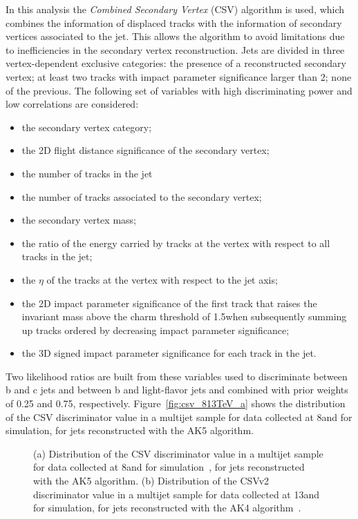 In this analysis the {\itshape Combined Secondary Vertex} (CSV) algorithm is used, which combines the information of displaced tracks with the information of secondary vertices associated to the jet.
This allows the algorithm to avoid limitations due to inefficiencies in the secondary vertex reconstruction. Jets are divided in three vertex-dependent exclusive categories: the presence of a reconstructed secondary vertex; at least two tracks with impact parameter significance larger than 2; none of the previous. The following set of variables with high discriminating power and low correlations are considered:

\begin{itemize}
\item the secondary vertex category;
\item the 2D flight distance significance of the secondary vertex;
\item the number of tracks in the jet
\item the number of tracks associated to the secondary vertex;
\item the secondary vertex mass;
\item the ratio of the energy carried by tracks at the vertex with respect to all tracks in the jet;
\item the $\eta$ of the tracks at the vertex with respect to the jet axis;
\item the 2D impact parameter significance of the first track that raises the invariant mass above the charm threshold of 1.5\GeV when subsequently summing up tracks ordered by decreasing impact parameter significance;
\item the 3D signed impact parameter significance for each track in the jet.
\end{itemize}

Two likelihood ratios are built from these variables used to discriminate between b and c jets and between b and light-flavor jets and combined with prior weights of 0.25 and 0.75, respectively. Figure~\ref{fig:csv_813TeV_a} shows the distribution of the CSV discriminator value in a multijet sample for data collected at 8\TeV and for simulation, for jets reconstructed with the AK5 algorithm.

\begin{figure}[!htb]
\begin{center}
\end{center} 
\caption{(a) Distribution of the CSV discriminator value in a multijet sample for data collected at 8\TeV and for simulation~\cite{CMS:BTV13001}, for jets reconstructed with the AK5 algorithm. (b) Distribution of the CSVv2 discriminator value in a multijet sample for data collected at 13\TeV and for simulation, for jets reconstructed with the AK4 algorithm~\cite{CMS-PAS-BTV-15-001}.}
\label{fig:csv_813TeV}
\end{figure}


